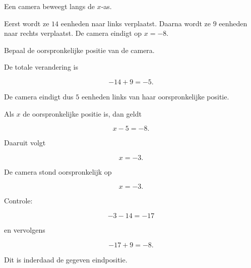 \documentclass{ximera}
\begin{document}
    
    \begin{oefening}{\oefG\ESS}
    
    Een camera beweegt langs de \(x\)-as.
    
    Eerst wordt ze \(14\) eenheden naar links verplaatst.
    Daarna wordt ze \(9\) eenheden naar rechts verplaatst.
    De camera eindigt op \(x=-8\).
    
    \begin{question}
    
    Bepaal de oorspronkelijke positie van de camera.
    
    \begin{oplossing}
    
    De totale verandering is
    
    \[
    -14+9=-5.
    \]
    
    De camera eindigt dus \(5\) eenheden links van haar oorspronkelijke
    positie.
    
    Als \(x\) de oorspronkelijke positie is, dan geldt
    
    \[
    x-5=-8.
    \]
    
    Daaruit volgt
    
    \[
    x=-3.
    \]
    
    De camera stond oorspronkelijk op
    
    \[
    x=-3.
    \]
    
    Controle:
    
    \[
    -3-14=-17
    \]
    
    en vervolgens
    
    \[
    -17+9=-8.
    \]
    
    Dit is inderdaad de gegeven eindpositie.
    
    \end{oplossing}
    
    \end{question}
    
    \end{oefening}
    
\end{document}
